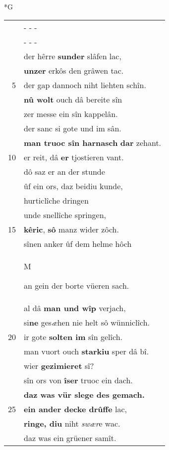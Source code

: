 \documentclass[8pt,a4paper,notitlepage]{article}
\begin{document}
\newpage
\begin{table}[ht]
\begin{minipage}[t]{0.5\linewidth}
\small
\begin{center}*G
\end{center}
\begin{tabular}{rl}
 & \multicolumn{1}{l}{ - - - }\\ 
 & \multicolumn{1}{l}{ - - - }\\ 
 & der hêrre \textbf{sunder} slâfen lac,\\ 
 & \textbf{unzer} erkôs den grâwen tac.\\ 
5 & der gap dannoch niht liehten schîn.\\ 
 & \textbf{nû wolt} ouch dâ bereite sîn\\ 
 & zer messe ein sîn kappelân.\\ 
 & der sanc si gote und im sân.\\ 
 & \textbf{man truoc sîn harnasch} \textbf{dar} zehant.\\ 
10 & er reit, dâ \textbf{er} tjostieren vant.\\ 
 & dô saz er an der stunde\\ 
 & ûf ein ors, daz beidiu kunde,\\ 
 & hurticlîche dringen\\ 
 & unde snellîche springen,\\ 
15 & \textbf{kêric}, \textbf{sô} manz wider zôch.\\ 
 & sînen anker ûf dem helme hôch\\ 
 & \begin{large}M\end{large}an gein der borte vüeren sach.\\ 
 & al dâ \textbf{man und wîp} verjach,\\ 
 & si\textbf{ne} ges\textit{æ}hen nie helt sô wünniclîch.\\ 
20 & ir gote \textbf{solten im} sîn gelîch.\\ 
 & man vuort ouch \textbf{starkiu} sper dâ bî.\\ 
 & wier \textbf{gezimieret} sî?\\ 
 & sîn ors von \textbf{îser} truoc ein dach.\\ 
 & \textbf{daz was vür slege des gemach.}\\ 
25 & \textbf{ein ander decke drûffe} lac,\\ 
 & \textbf{ringe, diu} niht \textit{swær}e wac.\\ 
 & daz was ein grüener samît.\\ 

\end{tabular}
\end{minipage}
\end{table}
\end{document}
